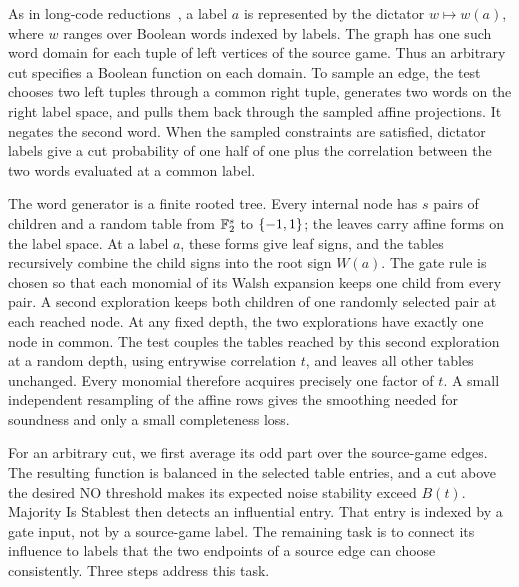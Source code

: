 As in long-code reductions~\cite{BGS98,Hastad01}, a label $a$ is represented
by the dictator $w\mapsto w(a)$, where $w$ ranges over Boolean words
indexed by labels. The graph has one such word domain for each tuple of
left vertices of the source game. Thus an arbitrary cut specifies a
Boolean function on each domain. To sample an edge, the test chooses two
left tuples through a common right tuple, generates two words on the
right label space, and pulls them back through the sampled affine
projections. It negates the second word. When the sampled constraints
are satisfied, dictator labels give a cut probability of one half of one
plus the correlation between the two words evaluated at a common label.

The word generator is a finite rooted tree. Every internal node has $s$
pairs of children and a random table from $\mathbb F_2^s$ to $\{-1,1\}$; the leaves
carry affine forms on the label space. At a label $a$, these forms give
leaf signs, and the tables recursively combine the child signs into the
root sign $W(a)$. The gate rule is chosen so that each monomial of its
Walsh expansion keeps one child from every pair. A second exploration
keeps both children of one randomly selected pair at each reached node.
At any fixed depth, the two explorations have exactly one node in
common. The test couples the tables reached by this second exploration
at a random depth, using entrywise correlation $t$, and leaves all other
tables unchanged. Every monomial therefore acquires precisely one factor
of $t$. A small independent resampling of the affine rows gives the
smoothing needed for soundness and only a small completeness loss.

For an arbitrary cut, we first average its odd part over the source-game
edges. The resulting function is balanced in the selected table entries,
and a cut above the desired NO threshold makes its expected noise
stability exceed $B(t)$. Majority Is Stablest then detects an influential
entry. That entry is indexed by a gate input, not by a source-game label.
The remaining task is to connect its influence to labels that the two
endpoints of a source edge can choose consistently. Three steps address
this task.

